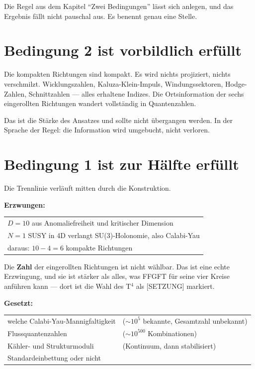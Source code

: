 \documentclass[11pt]{report}
\begin{document}
Die Regel aus dem Kapitel \enquote{Zwei Bedingungen} lässt sich
anlegen, und das Ergebnis fällt nicht pauschal aus. Es benennt genau
eine Stelle.

\section{Bedingung 2 ist vorbildlich erfüllt}

Die kompakten Richtungen sind kompakt. Es wird nichts projiziert,
nichts verschmilzt. Wicklungszahlen, Kaluza-Klein-Impuls,
Windungssektoren, Hodge-Zahlen, Schnittzahlen --- alles erhaltene
Indizes. Die Ortsinformation der sechs eingerollten Richtungen wandert
vollständig in Quantenzahlen.

Das ist die Stärke des Ansatzes und sollte nicht übergangen werden. In
der Sprache der Regel: die Information wird umgebucht, nicht verloren.

\section{Bedingung 1 ist zur Hälfte erfüllt}

Die Trennlinie verläuft mitten durch die Konstruktion.

\textbf{Erzwungen:}
\begin{center}
\begin{tabular}{l}
$D = 10$ aus Anomaliefreiheit und kritischer Dimension \\
$N = 1$ SUSY in 4D verlangt SU(3)-Holonomie, also Calabi-Yau \\
daraus: $10 - 4 = 6$ kompakte Richtungen \\
\end{tabular}
\end{center}

Die \textbf{Zahl} der eingerollten Richtungen ist nicht wählbar. Das
ist eine echte Erzwingung, und sie ist stärker als alles, was FFGFT für
seine vier Kreise anführen kann --- dort ist die Wahl des T$^4$ als
[SETZUNG] markiert.

\textbf{Gesetzt:}
\begin{center}
\begin{tabular}{ll}
welche Calabi-Yau-Mannigfaltigkeit & ($\sim 10^5$ bekannte, Gesamtzahl unbekannt) \\
Flussquantenzahlen & ($\sim 10^{500}$ Kombinationen) \\
Kähler- und Strukturmoduli & (Kontinuum, dann stabilisiert) \\
Standardeinbettung oder nicht & \\
\end{tabular}
\end{center}
\end{document}
